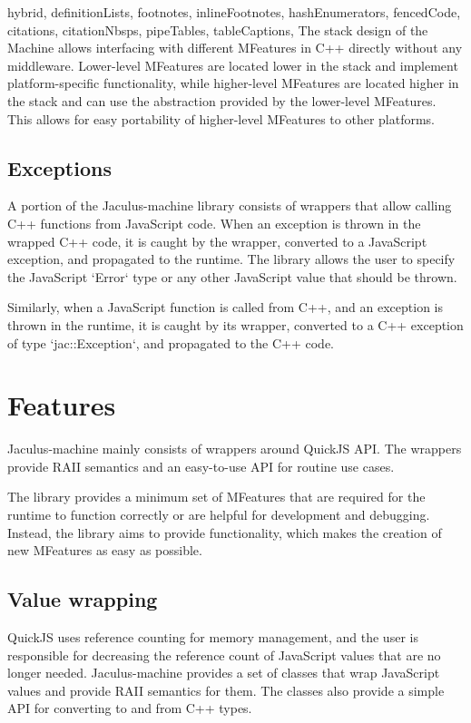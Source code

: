 \begin{markdown*}{%
  hybrid,
  definitionLists,
  footnotes,
  inlineFootnotes,
  hashEnumerators,
  fencedCode,
  citations,
  citationNbsps,
  pipeTables,
  tableCaptions,
}
The stack design of the Machine allows interfacing with different MFeatures in C++ directly without any middleware. Lower-level MFeatures are located lower in the stack and implement platform-specific functionality, while higher-level MFeatures are located higher in the stack and can use the abstraction provided by the lower-level MFeatures. This allows for easy portability of higher-level MFeatures to other platforms.

\subsection{Exceptions}

A portion of the Jaculus-machine library consists of wrappers that allow calling C++ functions from JavaScript code. When an exception is thrown in the wrapped C++ code, it is caught by the wrapper, converted to a JavaScript exception, and propagated to the runtime. The library allows the user to specify the JavaScript `Error` type or any other JavaScript value that should be thrown.

Similarly, when a JavaScript function is called from C++, and an exception is thrown in the runtime, it is caught by its wrapper, converted to a C++ exception of type `jac::Exception`, and propagated to the C++ code.


\section{Features}

Jaculus-machine mainly consists of wrappers around QuickJS API. The wrappers provide RAII semantics and an easy-to-use API for routine use cases.

The library provides a minimum set of MFeatures that are required for the runtime to function correctly or are helpful for development and debugging. Instead, the library aims to provide functionality, which makes the creation of new MFeatures as easy as possible.


\subsection{Value wrapping}

QuickJS uses reference counting for memory management, and the user is responsible for decreasing the reference count of JavaScript values that are no longer needed. Jaculus-machine provides a set of classes that wrap JavaScript values and provide RAII semantics for them. The classes also provide a simple API for converting to and from C++ types.


\end{markdown*}
